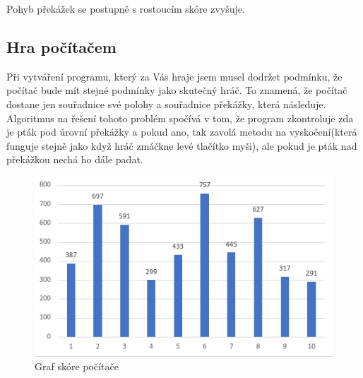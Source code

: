 Pohyb překážek se postupně s rostoucím skóre zvyšuje.

\subsection{Hra počítačem}
Při vytváření programu, který za Vás hraje jsem musel dodržet podmínku, že počítač bude mít stejné podmínky jako skutečný hráč. To znamená, že počítač dostane jen souřadnice své polohy a souřadnice překážky, která následuje. Algoritmus na řešení tohoto problém spočívá v tom, že program zkontroluje zda je pták pod úrovní překážky a pokud ano, tak zavolá metodu na vyskočení(která funguje stejně jako když hráč zmáčkne levé tlačítko myši), ale pokud je pták nad překážkou nechá ho dále padat.

\begin{figure}[ht!]
    \centering
    \includegraphics[scale=0.7]{images/graph.png}
    \caption{Graf skóre počítače}
\end{figure}

